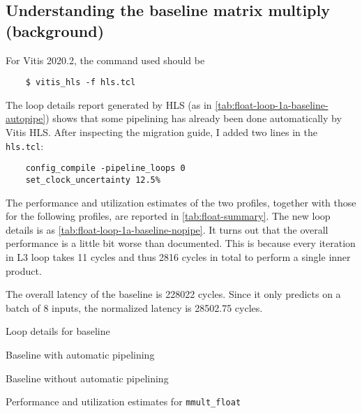 \subsection{Understanding the baseline matrix multiply (background)}\label{sec:1a}

For Vitis 2020.2, the command used should be
\begin{verbatim}
    $ vitis_hls -f hls.tcl
\end{verbatim}
The loop details report generated by HLS (as in \autoref{tab:float-loop-1a-baseline-autopipe}) shows that some pipelining has already been done automatically by Vitis HLS.
After inspecting the migration guide, I added two lines in the \texttt{hls.tcl}:
\begin{verbatim}
    config_compile -pipeline_loops 0
    set_clock_uncertainty 12.5%
\end{verbatim}

The performance and utilization estimates of the two profiles, together with those for the following profiles, are reported in \autoref{tab:float-summary}.
The new loop details is as \autoref{tab:float-loop-1a-baseline-nopipe}.
It turns out that the overall performance is a little bit worse than documented.
This is because every iteration in L3 loop takes 11 cycles and thus
2816 cycles in total to perform a single inner product.

The overall latency of the baseline is 228022 cycles.
Since it only predicts on a batch of 8 inputs, the normalized latency is 28502.75 cycles.

\begin{table}[ht!]

    \caption{Loop details for baseline}

    \begin{subtable}{\textwidth}
        \caption{Baseline with automatic pipelining}
        \label{tab:float-loop-1a-baseline-autopipe}
        \centering
        
    \end{subtable}

    \begin{subtable}{\textwidth}
        \caption{Baseline without automatic pipelining}
        \label{tab:float-loop-1a-baseline-nopipe}
        \centering
        
    \end{subtable}

\end{table}

\begin{table}
    \caption{Performance and utilization estimates for \texttt{mmult\_float}}\label{tab:float-summary}
    
\end{table}
